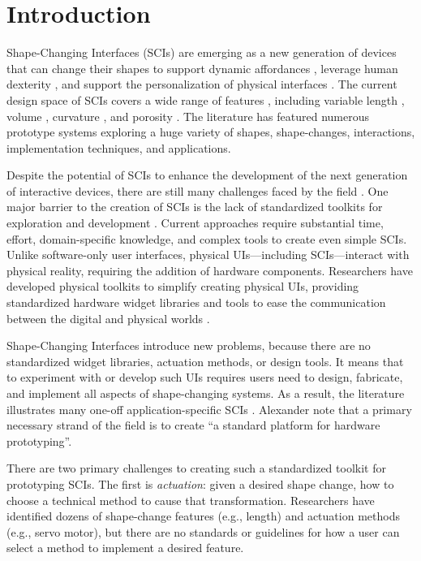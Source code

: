  \section{Introduction}
    Shape-Changing Interfaces (SCIs) are emerging as a new generation of
    devices that can change their shapes to support dynamic affordances
    \cite{Follmer:2013}, leverage human dexterity \cite{6926382},
    and support the personalization of physical interfaces
    \cite{Kim:2008}. The current design space of SCIs covers a
    wide range of features \cite{10.1145/3173574.3174193}, including variable
    length \cite{Follmer:2013}, volume
    \cite{10.1145/1357054.1357090}, curvature \cite{Yao:2013}, and porosity
    \cite{10.1145/1517664.1517671}. The literature has featured numerous
    prototype systems exploring a huge variety of shapes, shape-changes,
    interactions, implementation techniques, and applications. 
    
    Despite the potential of SCIs to enhance the development of the
    next generation of interactive devices, there are still many challenges
    faced by the field \cite{10.1145/3173574.3173873}. One major barrier to
    the creation of SCIs is the lack of standardized toolkits for
    exploration and development \cite{10.1145/3173574.3173873}. Current
    approaches require substantial time, effort, domain-specific knowledge,
    and complex tools to create even simple SCIs. Unlike software-only
    user interfaces, physical UIs---including SCIs---interact with
    physical reality, requiring the addition of hardware components.
    Researchers have developed physical toolkits to simplify creating physical
    UIs, providing standardized hardware widget libraries
    \cite{Greenberg:2001,Bdeir:2009kz} and tools to ease the communication
    between the digital and physical worlds \cite{Hartmann:2007p4338}.
    
    Shape-Changing Interfaces introduce new problems, because there are no
    standardized widget libraries, actuation methods, or design tools. It
    means that to experiment with or develop such UIs requires users need to
    design, fabricate, and implement all aspects of shape-changing systems. As
    a result, the literature illustrates many one-off application-specific
    SCIs \cite{Sturdee:2018ce}. Alexander \etal note that a primary necessary
    strand of the field is to create ``a standard platform for hardware
    prototyping''.
    
    There are two primary challenges to creating such a standardized toolkit
    for prototyping SCIs. The first is \textit{actuation}: given a
    desired shape change, how to choose a technical method to cause that
    transformation. Researchers have identified dozens of shape-change
    features \cite{10.1145/3173574.3174193} (e.g., length) and actuation
    methods \cite{Sturdee:2018ce} (e.g., servo motor), but there are no
    standards or guidelines for how a user can select a method to implement a
    desired feature.
    
